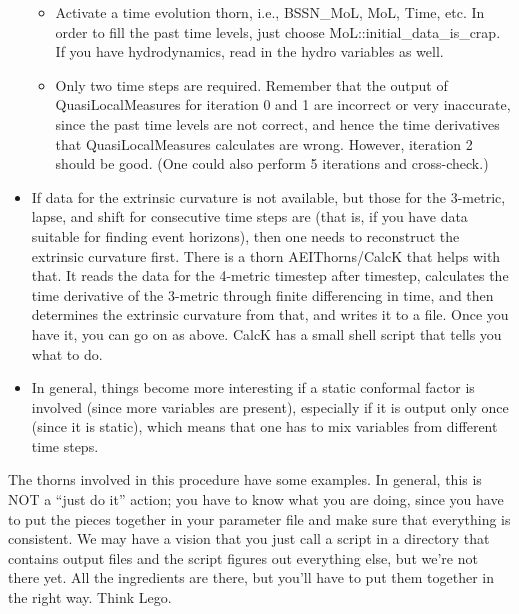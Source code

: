 \begin{itemize}
\begin{itemize}
\item Activate a time evolution thorn, i.e., BSSN\_MoL, MoL, Time,
  etc.  In order to fill the past time levels, just choose
  MoL::initial\_data\_is\_crap.  If you have hydrodynamics, read in
  the hydro variables as well.

\item Only two time steps are required. Remember that the output of
  QuasiLocalMeasures for iteration 0 and 1 are incorrect or very
  inaccurate, since the past time levels are not correct, and hence
  the time derivatives that QuasiLocalMeasures calculates are wrong.
  However, iteration 2 should be good.  (One could also perform 5
  iterations and cross-check.)

\end{itemize}


\item

  If data for the extrinsic curvature is not available, but those for
  the 3-metric, lapse, and shift for consecutive time steps are (that
  is, if you have data suitable for finding event horizons), then one
  needs to reconstruct the extrinsic curvature first.  There is a
  thorn AEIThorns/CalcK that helps with that.  It reads the data for
  the 4-metric timestep after timestep, calculates the time derivative
  of the 3-metric through finite differencing in time, and then
  determines the extrinsic curvature from that, and writes it to a
  file.  Once you have it, you can go on as above.  CalcK has a small
  shell script that tells you what to do.


\item

  In general, things become more interesting if a static conformal
  factor is involved (since more variables are present), especially if
  it is output only once (since it is static), which means that one
  has to mix variables from different time steps.

\end{itemize}

The thorns involved in this procedure have some examples.  In general,
this is NOT a ``just do it'' action; you have to know what you are
doing, since you have to put the pieces together in your parameter
file and make sure that everything is consistent.  We may have a
vision that you just call a script in a directory that contains output
files and the script figures out everything else, but we're not there
yet.  All the ingredients are there, but you'll have to put them
together in the right way.  Think Lego.



